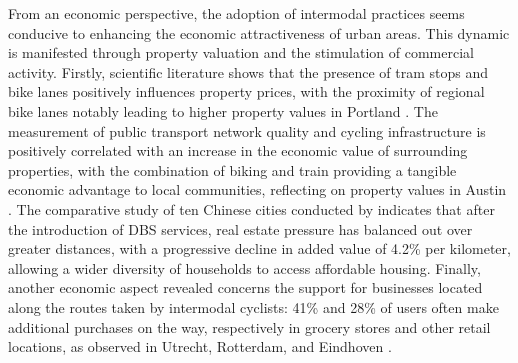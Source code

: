 \begin{refsegment}
From an economic perspective, the adoption of intermodal practices seems conducive to enhancing the economic attractiveness of urban areas. This dynamic is manifested through property valuation and the stimulation of commercial activity. Firstly, scientific literature shows that the presence of tram stops and bike lanes positively influences property prices, with the proximity of regional bike lanes notably leading to higher property values in Portland \textcolor{blue}{\autocite[270]{welch_long-term_2016}}. The measurement of public transport network quality and cycling infrastructure is positively correlated with an increase in the economic value of surrounding properties, with the combination of biking and train providing a tangible economic advantage to local communities, reflecting on property values in Austin \textcolor{blue}{\autocite[3495]{li_exploring_2017}}. The comparative study of ten Chinese cities conducted by \textcolor{blue}{\autocite[10]{chu_last_2021}} indicates that after the introduction of \acrshort{DBS} services, real estate pressure has balanced out over greater distances, with a progressive decline in added value of 4.2\% per kilometer, allowing a wider diversity of households to access affordable housing. Finally, another economic aspect revealed concerns the support for businesses located along the routes taken by intermodal cyclists: 41\% and 28\% of users often make additional purchases on the way, respectively in grocery stores and other retail locations, as observed in Utrecht, Rotterdam, and Eindhoven \textcolor{blue}{\autocite[14]{jonkeren_bicycle-train_2021}}.%


\end{refsegment}
